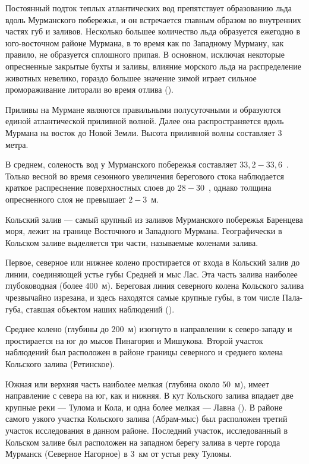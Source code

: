 Постоянный подток теплых атлантических вод препятствует образованию льда вдоль Мурманского побережья, и он встречается главным образом во внутренних частях губ и заливов.
Несколько большее количество льда образуется ежегодно в юго-восточном районе Мурмана, в то время как по Западному Мурману, как правило, не образуется сплошного припая. 
В основном, исключая некоторые опресненные закрытые бухты и заливы, влияние морского льда на распределение животных невелико, гораздо большее значение зимой играет сильное промораживание литорали во время отлива (\cite{Propp_1971}).

Приливы на Мурмане являются правильными полусуточными и образуются единой атлантической приливной волной. 
Далее она распространяется вдоль Мурмана на восток до Новой Земли. 
Высота приливной волны составляет $3$ метра. 

В среднем, соленость вод у Мурманского побережья составляет $33,2 - 33,6$~\permil. 
Только весной во время сезонного увеличения берегового стока наблюдается краткое распреснение поверхностных слоев до $28 - 30$~\permil, однако толщина опресненного слоя не превышает $2 - 3$~м.

Кольский залив --- самый крупный из заливов Мурманского побережья Баренцева моря, лежит на границе Восточного и Западного Мурмана.
Географически в Кольском заливе выделяется три части, называемые коленами залива. 

Первое, северное или нижнее колено простирается от входа в Кольский залив до линии, соединяющей устье губы Средней и мыс Лас. 
Эта часть залива наиболее глубоководная (более $400$~м). 
Береговая линия северного колена Кольского залива чрезвычайно изрезана, и  здесь находятся самые крупные губы, в том числе Пала-губа, ставшая объектом наших наблюдений (\cite{Derugin_1915}).


Среднее колено (глубины до $200$~м) изогнуто в направлении к северо-западу и простирается на юг до мысов Пинагория и Мишукова. 
Второй участок наблюдений был расположен в районе границы северного и среднего колена Кольского залива (Ретинское).

Южная или верхняя часть наиболее мелкая (глубина около $50$~м), имеет направление с севера на юг, как и нижняя. 
В кут Кольского залива впадает две крупные реки --- Тулома и Кола, и одна более мелкая --- Лавна (\cite{Derugin_1915}).  
В районе самого узкого участка Кольского залива (Абрам-мыс) был расположен третий участок исследования в данном районе.
Последний участок, исследованный в Кольском заливе был расположен на западном берегу залива в черте города Мурманск (Северное Нагорное) в $3$~км от устья реку Туломы.


